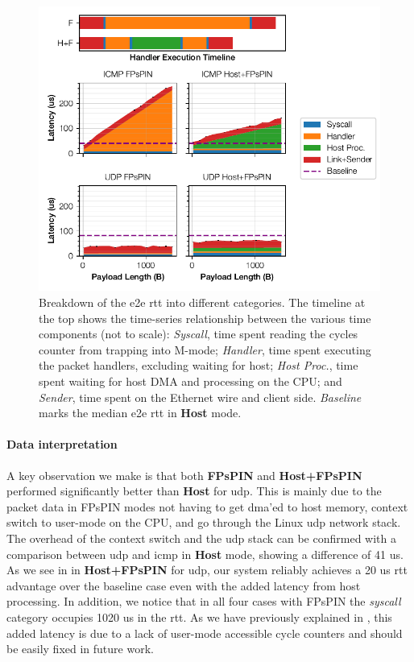 \begin{figure}[tp]
    \centering
    \includegraphics{thesis/figures/pingpong-breakdown.pdf}
    \caption{Breakdown of the \ac{e2e} \ac{rtt} into different categories.  The timeline at the top shows the time-series relationship between the various time components (not to scale): \emph{Syscall}, time spent reading the cycles counter from trapping into M-mode; \emph{Handler}, time spent executing the packet handlers, excluding waiting for host; \emph{Host Proc.}, time spent waiting for host DMA and processing on the CPU; and \emph{Sender}, time spent on the Ethernet wire and client side.  \emph{Baseline} marks the median \ac{e2e} \ac{rtt} in \textbf{Host} mode.} \label{fig:pingpong-breakdown}
\end{figure}

\paragraph{Data interpretation} A key observation we make is that both \textbf{FPsPIN} and \textbf{Host+FPsPIN} performed significantly better than \textbf{Host} for \ac{udp}.  This is mainly due to the packet data in FPsPIN modes not having to get \ac{dma}'ed to host memory, context switch to user-mode on the CPU, and go through the Linux \ac{udp} network stack.  The overhead of the context switch and the \ac{udp} stack can be confirmed with a comparison between \ac{udp} and \ac{icmp} in \textbf{Host} mode, showing a difference of \mytilde{}41 us.  As we see in  in \textbf{Host+FPsPIN} for \ac{udp}, our system reliably achieves a \mytilde{}20 us \ac{rtt} advantage over the baseline case even with the added latency from host processing.  In addition, we notice that in all four cases with FPsPIN the \emph{syscall} category occupies 10\mytilde{}20 us in the \ac{rtt}.  As we have previously explained in , this added latency is due to a lack of user-mode accessible cycle counters and should be easily fixed in future work.

